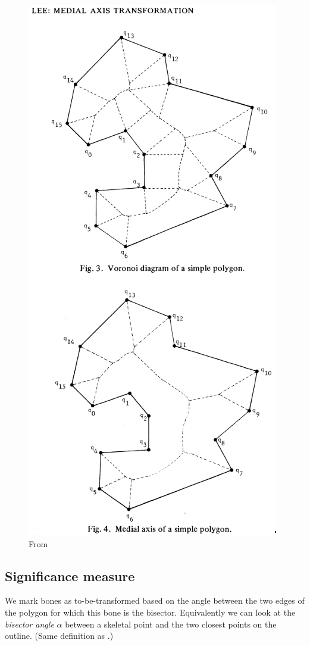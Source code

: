 \begin{figure}
\centering
\includegraphics[width=.8\columnwidth]{sources/method/voronoi_MAT.png}
\caption{From \citeauthor{lee1982medial} \cite{lee1982medial}}
\label{voronoi_MAT}
\end{figure}





\subsection{Significance measure}\label{sec:significance_measure}
We mark bones as to-be-transformed based on the angle between the two edges of the polygon for which this bone is the bisector.
Equivalently we can look at the \emph{bisector angle} $\alpha$ between a skeletal point and the two closest points on the outline.
(Same definition as \cite{attali1996modeling}.)

